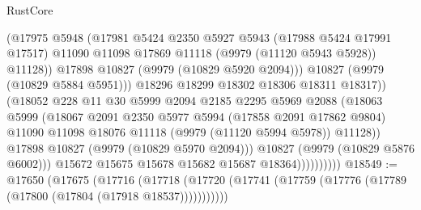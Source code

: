 \begin{lexlean}{RustCore}
\begin{coremodule}
                                  (@17975
                                    @5948
                                    (@17981
                                      @5424
                                      @2350
                                      @5927
                                      @5943
                                      (@17988 @5424 @17991 @17517)
                                      @11090
                                      @11098
                                      @17869
                                      @11118
                                      (@9979 (@11120 @5943 @5928))
                                      @11128))
                                  @17898
                                  @10827
                                  (@9979 (@10829 @5920 @2094)))
                                @10827
                                (@9979 (@10829 @5884 @5951)))
                              @18296
                              @18299
                              @18302
                              @18306
                              @18311
                              @18317))
                          (@18052
                            @228
                            @11
                            @30
                            @5999
                            @2094
                            @2185
                            @2295
                            @5969
                            @2088
                            (@18063
                              @5999
                              (@18067
                                @2091
                                @2350
                                @5977
                                @5994
                                (@17858 @2091 @17862 @9804)
                                @11090
                                @11098
                                @18076
                                @11118
                                (@9979 (@11120 @5994 @5978))
                                @11128))
                            @17898
                            @10827
                            (@9979 (@10829 @5970 @2094)))
                          @10827
                          (@9979 (@10829 @5876 @6002)))
                        @15672
                        @15675
                        @15678
                        @15682
                        @15687
                        @18364))))))))))
@18549 := @17650
    (@17675
      (@17716
        (@17718 (@17720 (@17741 (@17759 (@17776 (@17789 (@17800 (@17804 (@17918 @18537)))))))))))

\end{coremodule}
\end{lexlean}
